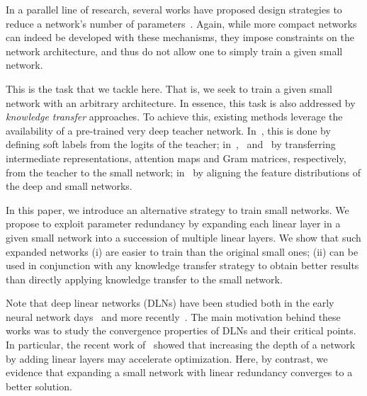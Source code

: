 \documentclass[10pt,twocolumn,letterpaper]{article}
\begin{document}
In a parallel line of research, several works have proposed design strategies to reduce a network's number of parameters~\cite{wu2016squeezedet,inceptionv4,howard2017mobilenets,ErFNet2018}. Again, while more compact networks can indeed be developed with these mechanisms, they impose constraints on the network architecture, and thus do not allow one to simply train a given small network. 

This is the task that we tackle here. That is, we seek to train a given small network with an arbitrary architecture. In essence, this task is also addressed by {\it knowledge transfer} approaches. To achieve this, existing methods leverage the availability of a pre-trained very deep teacher network. In~\cite{hinton2015distilling}, this is done by defining soft labels from the logits of the teacher; in~\cite{romero2014fitnets},~\cite{YimJBK17} and~\cite{Zagoruyko2017AT} by transferring intermediate representations, attention maps and Gram matrices, respectively, from the teacher to the small network; in~\cite{pkt_eccv} by aligning the feature distributions of the deep and small networks.

In this paper, we introduce an alternative strategy to train small networks. We propose to exploit parameter redundancy by expanding each linear layer in a given small network into a succession of multiple linear layers. We show that such expanded networks (i) are easier to train than the original small ones; (ii) can be used in conjunction with any knowledge transfer strategy to obtain better results than directly applying knowledge transfer to the small network. 

Note that deep linear networks (DLNs) have been studied both in the early neural network days~\cite{Baldi1989} and more recently~\cite{saxe2014,Kawaguchi2016,Laurent2018,YiZhou2018,AroraCH18}. The main motivation behind these works was to study the convergence properties of DLNs and their critical points. 
In particular, the recent work of~\cite{AroraCH18} showed that increasing the depth of a network by adding linear layers may accelerate optimization. Here, by contrast, we evidence that expanding a small network with linear redundancy converges to a better solution. 
\end{document}
